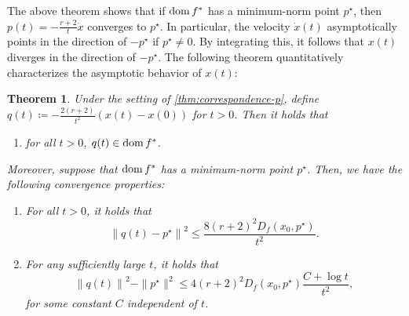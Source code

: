 \documentclass[11pt,a4paper]{article}
\theoremstyle{definition}
\theoremstyle{plain}
\newtheorem{thm}{Theorem}[section]
\newcommand{\dom}{\mathop{\rm dom}}
\begin{document}
The above theorem shows that if $\dom f^\ast$ has a minimum-norm point $p^\star$, then $p(t) = -\frac{r + 2}{t}\dot x$ converges to $p^\star$.
In particular, the velocity $\dot x(t)$ asymptotically points in the direction of $-p^\star$ if $p^\star \neq 0$.
By integrating this, it follows that $x(t)$ diverges in the direction of $-p^\star$.
The following theorem quantitatively characterizes the asymptotic behavior of $x(t)$:
\begin{thm}
    \label{thm:correspondence-q}
    Under the setting of \cref{thm:correspondence-p}, define $q(t) \coloneqq -\frac{2(r + 2)}{t^2}(x(t) - x(0))$ for $t > 0$.
    Then it holds that
    \begin{enumerate}
        \item[(a)] for all $t > 0$, $q(t) \in \dom f^\ast$.
    \end{enumerate}
    Moreover, suppose that $\dom f^\ast$ has a minimum-norm point $p^\star$.
    Then, we have the following convergence properties:
    \begin{enumerate}
        \item[(b)] For all $t > 0$, it holds that
        \[
            \left\|q(t) - p^\star\right\|^2 \le \frac{8(r + 2)^2D_f(x_0, p^\star)}{t^2}.
        \]
        \item[(c)] For any sufficiently large $t$, it holds that
        \[
            \left\|q(t)\right\|^2 - \|p^\star\|^2 \le 4(r + 2)^2D_f(x_0, p^\star)\frac{C + \log t}{t^2},
        \]
        for some constant $C$ independent of $t$.
    \end{enumerate}
\end{thm}
\end{document}
